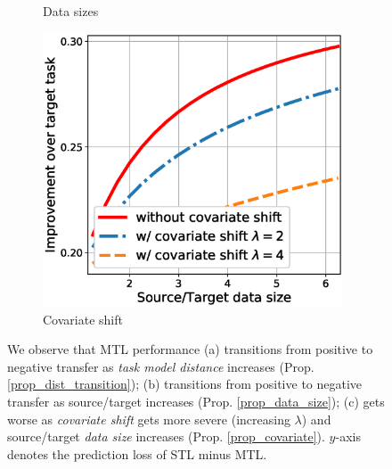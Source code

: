 \begin{figure}[!t]
\begin{subfigure}[b]{0.32\textwidth}
		\vspace{-0.075in}
		\caption{Data sizes}
		\label{fig_size}
	\end{subfigure}\hfill
	\begin{subfigure}[b]{0.32\textwidth}
		\centering
		\includegraphics[width=0.98\textwidth]{figures/complementary.eps}
		\vspace{-0.075in}
		\caption{Covariate shift}
		\label{fig_covariate}
	\end{subfigure}
	\caption{%
	We observe that MTL performance
	(a) transitions from positive to negative transfer as \textit{task model distance} increases (Prop. \ref{prop_dist_transition});
	(b) transitions from positive to negative transfer as source/target  increases (Prop. \ref{prop_data_size});
	(c) gets worse as \textit{covariate shift} gets more severe (increasing $\lambda$) and source/target \textit{data size} increases (Prop. \ref{prop_covariate}).
	$y$-axis denotes the prediction loss of STL minus MTL.}
	\label{fig_model_shift_phasetrans}
	\vspace{-0.1in}
\end{figure}





